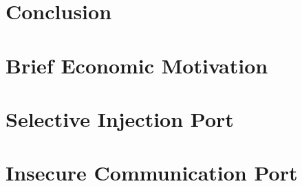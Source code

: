\documentclass{article}
\theoremstyle{definition}
\theoremstyle{hypothesis}
\theoremstyle{corollary}
\theoremstyle{lemma}
\theoremstyle{theorem}
\theoremstyle{theorem}
\begin{document}
\section{Conclusion}\label{sec:conclusion}

\newpage

\appendix
\section{Brief Economic Motivation}\label{app:economy}

\section{Selective Injection Port}\label{app:selectiveinjectionport}

\section{Insecure Communication Port}\label{app:insecurecom}


\printbibliography
\end{document}
